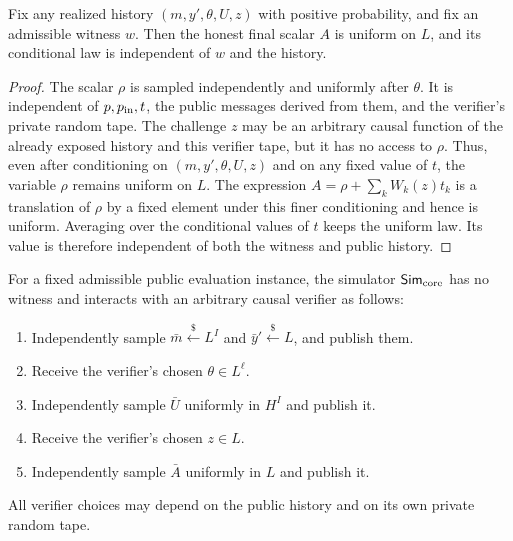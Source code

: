 \begin{lemma}\label{lem:zkrs:A-conditional}
Fix any realized history
$(m,y',\theta,U,z)$ with positive probability,
and fix an admissible witness $w$.
Then the honest final scalar $A$ is uniform on $L$,
and its conditional law is independent of $w$ and the history.
\end{lemma}
\begin{proof}
The scalar $\rho$ is sampled independently and uniformly
after $\theta$. It is independent of $p,p_{\rm in},t$,
the public messages derived from them, and the verifier's
private random tape. The challenge $z$ may be an arbitrary
causal function of the already exposed history and this verifier
tape, but it has no access to $\rho$. Thus, even after
conditioning on $(m,y',\theta,U,z)$ and on any fixed value of $t$,
the variable $\rho$ remains uniform on $L$.
The expression
$A=\rho+\sum_kW_k(z)t_k$
is a translation of $\rho$ by a fixed element
under this finer conditioning and hence is uniform.
Averaging over the conditional values of $t$
keeps the uniform law. Its value is therefore
independent of both the witness and public history.
\end{proof}

\begin{definition}\label{def:zkrs:core-sim}
For a fixed admissible public evaluation instance, the simulator
$\mathsf{Sim}_{\rm core}$ has no witness and interacts with
an arbitrary causal verifier as follows:
\begin{enumerate}[label=\textup{(\roman*)}]
\item Independently sample
$\bar m\overset{\$}{\leftarrow}L^I$
and $\bar y'\overset{\$}{\leftarrow}L$, and publish them.
\item Receive the verifier's chosen $\theta\in L^\ell$.
\item Independently sample $\bar U$ uniformly in $H^I$
and publish it.
\item Receive the verifier's chosen $z\in L$.
\item Independently sample $\bar A$ uniformly in $L$
and publish it.
\end{enumerate}
All verifier choices may depend on the public history
and on its own private random tape.
\end{definition}

